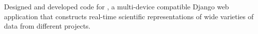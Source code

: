 \documentclass[]{deedy_format_Hien}
\begin{document}
\begin{minipage}[t]{0.66\textwidth}
\vspace{1mm}
\justify
\begin{tightemize}
\item Designed and developed  code for , a multi-device compatible Django web application that constructs real-time scientific representations of wide varieties of data from different projects.
\end{tightemize}
\vspace{\topsep}
\sectionsep





\end{minipage}
\end{document}
